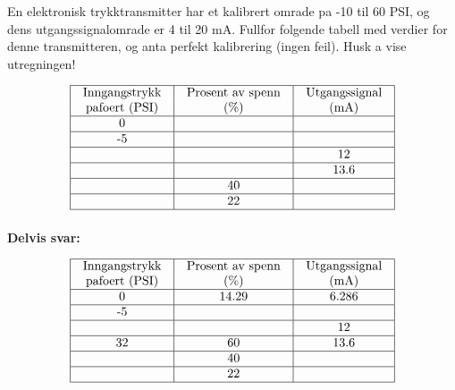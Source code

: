 

En elektronisk trykktransmitter har et kalibrert omrade pa -10 til 60 PSI, og dens utgangssignalomrade er 4 til 20 mA.  Fullfor folgende tabell med verdier for denne transmitteren, og anta perfekt kalibrering (ingen feil).  Husk a vise utregningen!


$$\vbox{\offinterlineskip
\halign{\strut
\vrule \quad\hfil # \ \hfil & 
\vrule \quad\hfil # \ \hfil & 
\vrule \quad\hfil # \ \hfil \vrule \cr
\noalign{\hrule}
%
Inngangstrykk & Prosent av spenn & Utgangssignal \cr
%
pafoert (PSI) & (\%) & (mA) \cr
%
\noalign{\hrule}
%
0 &  &  \cr
%
\noalign{\hrule}
%
-5 &  &  \cr
%
\noalign{\hrule}
%
 &  & 12 \cr
%
\noalign{\hrule}
%
 &  & 13.6 \cr
%
\noalign{\hrule}
%
 & 40 &  \cr
%
\noalign{\hrule}
%
 & 22 &  \cr
%
\noalign{\hrule}
} %
}$$ %







\noindent
{\bf Delvis svar:}


$$\vbox{\offinterlineskip
\halign{\strut
\vrule \quad\hfil # \ \hfil & 
\vrule \quad\hfil # \ \hfil & 
\vrule \quad\hfil # \ \hfil \vrule \cr
\noalign{\hrule}
%
Inngangstrykk & Prosent av spenn & Utgangssignal \cr
%
pafoert (PSI) & (\%) & (mA) \cr
%
\noalign{\hrule}
%
0 & 14.29 & 6.286 \cr
%
\noalign{\hrule}
%
-5 &  &  \cr
%
\noalign{\hrule}
%
 &  & 12 \cr
%
\noalign{\hrule}
%
32 & 60 & 13.6 \cr
%
\noalign{\hrule}
%
 & 40 &  \cr
%
\noalign{\hrule}
%
 & 22 &  \cr
%
\noalign{\hrule}
} %
}$$ %







